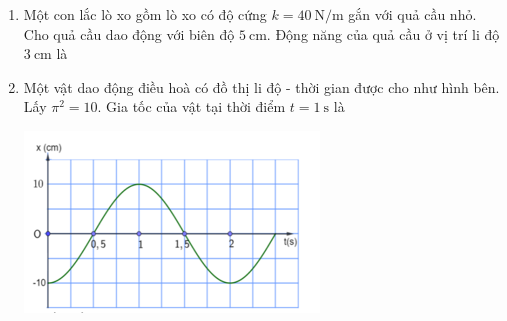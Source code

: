 \begin{enumerate}[label=\bfseries Câu \arabic*:]
\item Một con lắc lò xo gồm lò xo có độ cứng $k=\SI{40}{\newton/\meter}$ gắn với quả cầu nhỏ. Cho quả cầu dao động với biên độ $\SI{5}{\centi\meter}$. Động năng của quả cầu ở vị trí li độ $\SI{3}{\centi\meter}$ là

\item Một vật dao động điều hoà có đồ thị li độ - thời gian được cho như hình bên. Lấy $\pi^2=10$. Gia tốc của vật tại thời điểm $t=\SI{1}{\second}$ là
\begin{center}
	\includegraphics[width=0.4\linewidth]{../figs/C1-Q-3}
\end{center}


\end{enumerate}
